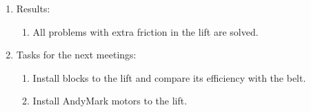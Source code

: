 \begin{enumerate}
\begin{enumerate}
	\end{enumerate}
	
	\item Results:
	\begin{enumerate}
		
		\item All problems with extra friction in the lift are solved.
		
	\end{enumerate}
	
	\item Tasks for the next meetings:
	\begin{enumerate}
		
		\item Install blocks to the lift and compare its efficiency with the belt.
		
		\item Install AndyMark motors to the lift.
			
	\end{enumerate}
\end{enumerate}
\fillpage
